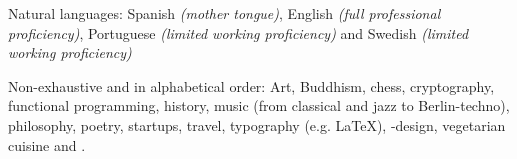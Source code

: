 \documentclass[10pt,a4paper]{article}
\begin{document}
\vspace{0.5em}
\inlineheadsection
  {Natural languages:}
  {Spanish \emph{(mother tongue)}, English \emph{(full professional proficiency)}, Portuguese \emph{(limited working proficiency)} and Swedish \emph{(limited working proficiency)}}


\spacedhrule{1.6em}{-0.4em}


\inlineheadsection
  {Non-exhaustive and in alphabetical order:}
  {Art, Buddhism, chess, cryptography, functional programming, history, music (from classical and jazz to Berlin-techno), philosophy, poetry,  startups, travel, typography (e.g. \LaTeX), -design, vegetarian cuisine and  .}
\end{document}
